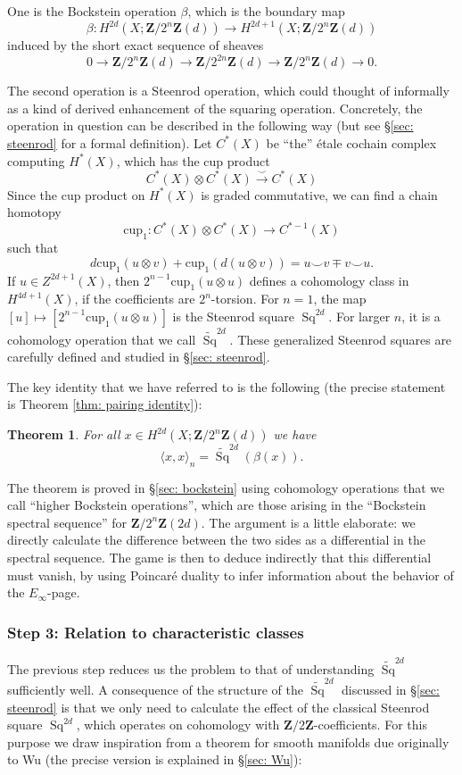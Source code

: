 \documentclass[10pt, reqno]{amsart}
\numberwithin{equation}{subsection}
\newcommand{\wt}[1]{\widetilde{#1}}
\newcommand{\Z}{\mathbf{Z}}
\newcommand{\mrm}[1]{\mathrm{#1}}
\newcommand{\co}{\colon}
\DeclareMathOperator{\et}{\acute{e}t}
\DeclareMathOperator{\Sq}{Sq}
\newtheorem{thm}{Theorem}[section]
\theoremstyle{remark}
\begin{document}
One is the Bockstein operation $\beta$, which is the boundary map 
\[
 \beta \co H^{2d}_{\et}(X; \Z/2^n\Z(d)) \rightarrow H^{2d+1}_{\et}(X; \Z/2^n\Z(d))
 \]
 induced by the short exact sequence of sheaves
\[
0 \rightarrow \Z/2^n\Z(d) \rightarrow \Z/2^{2n}\Z(d) \rightarrow \Z/2^{n}\Z(d) \rightarrow 0.
\]


The second operation is a Steenrod operation, which could thought of informally as a kind of derived enhancement of the squaring operation. Concretely, the operation in question can be described in the following way (but see \S \ref{sec: steenrod} for a formal definition). Let $C_{\et}^*(X)$ be ``the'' \'{e}tale cochain complex computing $H^*_{\et}(X)$, which has the cup product
\[
 C^*_{\et}(X) \otimes C^*_{\et}(X) \xrightarrow{\smile} C^*_{\et}(X)
\]
Since the cup product on $H^*_{\et}(X)$ is graded commutative, we can find a chain homotopy 
\[
\mrm{cup}_1 \co C^*_{\et}(X) \otimes C^*_{\et}(X) \rightarrow C^{*-1}_{\et}(X)
\]
such that 
\[
d\mrm{cup}_1(u \otimes v)+\mrm{cup}_1 (d(u \otimes v)) = u \smile v \mp  v \smile u. 
\]
If $u \in Z^{2d+1}_{\et}(X)$, then $2^{n-1}\mrm{cup}_1(u \otimes u) $ defines a cohomology class in $H^{4d+1}_{\et}(X)$, if the coefficients are $2^n$-torsion. For $n=1$, the map $[u] \mapsto [2^{n-1} \mrm{cup}_1(u \otimes u)]$ is the Steenrod square $\Sq^{2d}$. For larger $n$, it is a cohomology operation that we call $\wt{\Sq}^{2d}$. These generalized Steenrod squares are carefully defined and studied in \S \ref{sec: steenrod}.

The key identity that we have referred to is the following (the precise statement is Theorem \ref{thm: pairing identity}): 

\begin{thm}
For all $x\in H^{2d}_{\et}(X; \Z/2^n\Z(d))$ we have 
\[
\langle x, x\rangle_n = \wt{\Sq}^{2d} (\beta (x)).
\] 
\end{thm}

 The theorem is proved in \S \ref{sec: bockstein} using cohomology operations that we call ``higher Bockstein operations'', which are those arising in the ``Bockstein spectral sequence'' for $\Z/2^n \Z(2d)$. The argument is a little elaborate: we directly calculate the difference between the two sides as a differential in the spectral sequence. The game is then to deduce indirectly that this differential must vanish, by using Poincar\'{e} duality to infer information about the behavior of the $E_{\infty}$-page. 


\subsubsection*{Step 3: Relation to characteristic classes} 
The previous step reduces us the problem to that of understanding $\wt{\Sq}^{2d}$ sufficiently well. A consequence of the structure of the $\wt{\Sq}^{2d}$ discussed in \S \ref{sec: steenrod} is that we only need to calculate the effect of the classical Steenrod square $\Sq^{2d}$, which operates on cohomology with $\Z/2\Z$-coefficients. For this purpose we draw inspiration from a theorem for smooth manifolds due originally to Wu (the precise version is explained in \S \ref{sec: Wu}):
\end{document}
